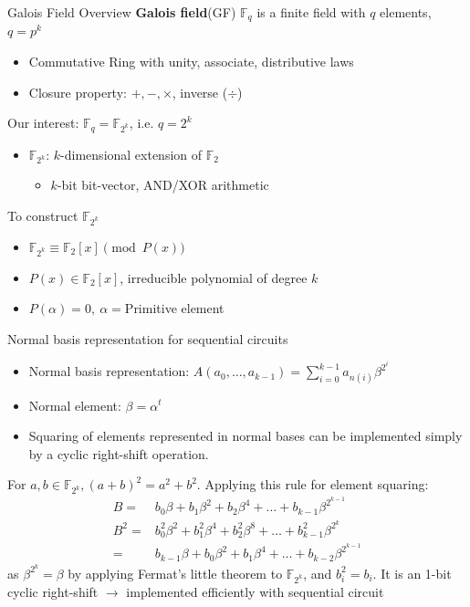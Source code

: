 \documentclass[xcolor=dvipsnames]{beamer}
\newcommand{\Fkk}{{\mathbb{F}}_{2^k}}
\newcommand{\bi}{\begin{itemize}}
\newcommand{\ei}{\end{itemize}}
\begin{document}
\begin{frame}{\large {Galois Field Overview}}
\textbf {Galois field}(GF) $\mathbb{F}_q$ is a finite field with $q$
elements, $q = p^k$
\begin{itemize}
\item Commutative Ring with unity, associate, distributive laws
\item Closure property: $+,-,\times$, inverse ($\div$)
\end{itemize}


Our interest: $\mathbb{F}_{q} = \mathbb{F}_{2^k}$, i.e. $q = 2^k$
\begin{itemize}
\item  $\mathbb{F}_{2^k}$: $k$-dimensional extension of  $\mathbb{F}_{2}$
	\begin{itemize}
	\item $k$-bit bit-vector, AND/XOR arithmetic
	\end{itemize}
\end{itemize}

To construct $\mathbb{F}_{2^k}$
\begin{itemize}
\item $\mathbb{F}_{2^k} \equiv \mathbb{F}_{2}[x] \pmod {P(x)}$
\item $P(x) \in \mathbb{F}_{2}[x]$, irreducible polynomial of degree $k$
\item $P(\alpha)=0,\ \alpha = $Primitive element
\end{itemize}

\end{frame}
\begin{frame}{\large{Normal basis representation for sequential circuits}}
\vspace{-0.5cm}
\bi
\item Normal basis representation: $A(a_0,\dots,a_{k-1}) = \sum_{i=0}^{k-1}a_{n(i)}\beta^{2^i}$
\item Normal element: $\beta = \alpha^t$
\item Squaring of elements represented in
normal bases can be implemented simply by a cyclic right-shift
operation.
\ei

\begin{Example}
\label{ex:nb_sq}
For $a, b \in \Fkk, (a+b)^2 = a^2 + b^2$. Applying this rule for
element squaring: 
\begin{align}
B = & b_0\beta + b_1\beta^2 + b_2\beta^4 + \dots + b_{k-1}\beta^{2^{k-1}} \nonumber\\
B^2 = &b_0^2\beta^2 + b_1^2\beta^4 + b_2^2\beta^8 + \dots + b_{k-1}^2\beta^{2^k} \nonumber\\
= &b_{k-1}\beta + b_0\beta^2 + b_1\beta^4 + \dots + b_{k-2}\beta^{2^{k-1}} \nonumber
\end{align}
as $\beta^{2^k} = \beta$ by applying Fermat's little theorem to $\Fkk$, and $b_i^2 = b_i$. 
It is an 1-bit cyclic right-shift $\to$ implemented efficiently with sequential circuit
\end{Example}
\end{frame}
\end{document}
